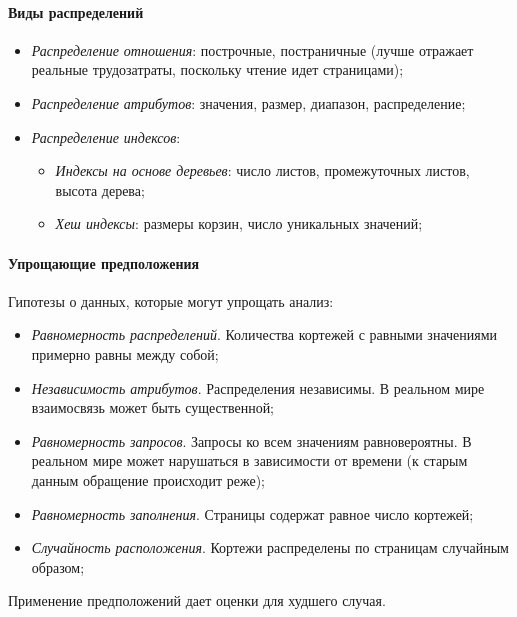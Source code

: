 \paragraph{Виды распределений}

\begin{itemize}
	\item \textit{Распределение отношения}: построчные, постраничные (лучше отражает реальные
	      трудозатраты, поскольку чтение идет страницами);
	\item \textit{Распределение атрибутов}: значения, размер, диапазон, распределение;
	\item \textit{Распределение индексов}:
	      \begin{itemize}
		      \item \textit{Индексы на основе деревьев}: число листов, промежуточных листов, высота
		            дерева;
		      \item \textit{Хеш индексы}: размеры корзин, число уникальных значений;
	      \end{itemize}
\end{itemize}

\paragraph{Упрощающие предположения}

Гипотезы о данных, которые могут упрощать анализ:

\begin{itemize}
	\item \textit{Равномерность распределений}. Количества кортежей с равными значениями примерно
	      равны между собой;
	\item \textit{Независимость атрибутов}. Распределения независимы. В реальном мире взаимосвязь
	      может быть существенной;
	\item \textit{Равномерность запросов}. Запросы ко всем значениям равновероятны. В реальном мире
	      может нарушаться в зависимости от времени (к старым данным обращение происходит реже);
	\item \textit{Равномерность заполнения}. Страницы содержат равное число кортежей;
	\item \textit{Случайность расположения}. Кортежи распределены по страницам случайным образом;
\end{itemize}

\begin{theorem}[Христодоулакиса]
	Применение предположений дает оценки для худшего случая.
\end{theorem}


